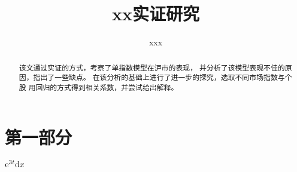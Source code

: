 \documentclass{mythesis}
\title{xx实证研究}
\author{xxx\quad 9000543}
\begin{document}
    \maketitle
    \begin{abstract}
        该文通过实证的方式，考察了单指数模型在沪市的表现，
        并分析了该模型表现不佳的原因，指出了一些缺点。
        在该分析的基础上进行了进一步的探究，选取不同市场指数与个股
        用回归的方式得到相关系数，并尝试给出解释。
    \end{abstract}
    \section{第一部分}
    $\mathrm e^{3t}\mathrm d x$
\end{document}
